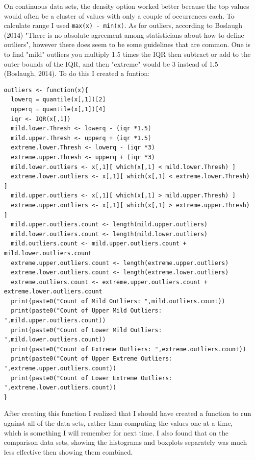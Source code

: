 \documentclass[10pt]{article}
\begin{document}
On continuous data sets, the density option worked better because the top values would often be a cluster of values with only a couple of occurrences each. To calculate range I used \verb|max(x) - min(x)|. As for outliers, according to Boslaugh (2014) "There is no absolute agreement among statisticians about how to define outliers", however there does seem to be some guidelines that are common. One is to find "mild" outliers you multiply 1.5 times the IQR then subtract or add to the outer bounds of the IQR, and then "extreme" would be 3 instead of 1.5 (Boslaugh, 2014). To do this I created a funtion:
\begin{verbatim}
outliers <- function(x){
  lowerq = quantile(x[,1])[2]
  upperq = quantile(x[,1])[4]
  iqr <- IQR(x[,1])
  mild.lower.Thresh <- lowerq - (iqr *1.5)
  mild.upper.Thresh <- upperq + (iqr *1.5)
  extreme.lower.Thresh <- lowerq - (iqr *3)
  extreme.upper.Thresh <- upperq + (iqr *3)
  mild.lower.outliers <- x[,1][ which(x[,1] < mild.lower.Thresh) ]
  extreme.lower.outliers <- x[,1][ which(x[,1] < extreme.lower.Thresh) ]
  mild.upper.outliers <- x[,1][ which(x[,1] > mild.upper.Thresh) ]
  extreme.upper.outliers <- x[,1][ which(x[,1] > extreme.upper.Thresh) ]
  mild.upper.outliers.count <- length(mild.upper.outliers)
  mild.lower.outliers.count <- length(mild.lower.outliers)
  mild.outliers.count <- mild.upper.outliers.count + mild.lower.outliers.count
  extreme.upper.outliers.count <- length(extreme.upper.outliers)
  extreme.lower.outliers.count <- length(extreme.lower.outliers)
  extreme.outliers.count <- extreme.upper.outliers.count + extreme.lower.outliers.count 
  print(paste0("Count of Mild Outliers: ",mild.outliers.count))
  print(paste0("Count of Upper Mild Outliers: ",mild.upper.outliers.count))
  print(paste0("Count of Lower Mild Outliers: ",mild.lower.outliers.count))
  print(paste0("Count of Extreme Outliers: ",extreme.outliers.count))
  print(paste0("Count of Upper Extreme Outliers: ",extreme.upper.outliers.count))
  print(paste0("Count of Lower Extreme Outliers: ",extreme.lower.outliers.count))
}
\end{verbatim}
After creating this function I realized that I should have created a function to run against all of the data sets, rather than computing the values one at a time, which is something I will remember for next time. I also found that on the comparison data sets, showing the histograms and boxplots separately was much less effective then showing them combined.
\end{document}
